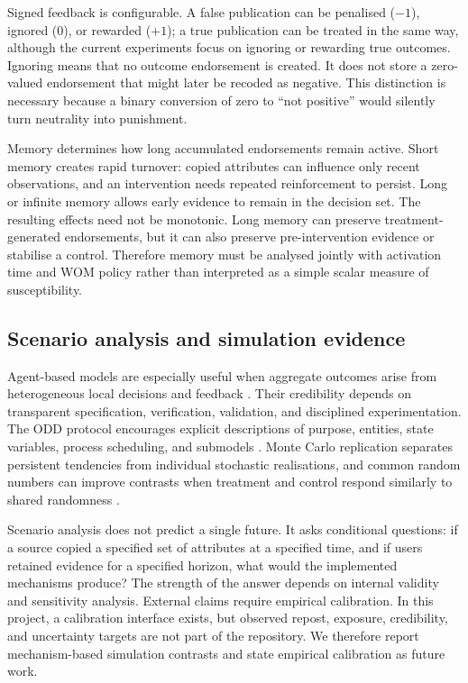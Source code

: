 Signed feedback is configurable. A false publication can be penalised ($-1$), ignored ($0$), or rewarded ($+1$); a true publication can be treated in the same way, although the current experiments focus on ignoring or rewarding true outcomes. Ignoring means that no outcome endorsement is created. It does not store a zero-valued endorsement that might later be recoded as negative. This distinction is necessary because a binary conversion of zero to ``not positive'' would silently turn neutrality into punishment.

Memory determines how long accumulated endorsements remain active. Short memory creates rapid turnover: copied attributes can influence only recent observations, and an intervention needs repeated reinforcement to persist. Long or infinite memory allows early evidence to remain in the decision set. The resulting effects need not be monotonic. Long memory can preserve treatment-generated endorsements, but it can also preserve pre-intervention evidence or stabilise a control. Therefore memory must be analysed jointly with activation time and WOM policy rather than interpreted as a simple scalar measure of susceptibility.

\subsection{Scenario analysis and simulation evidence}

Agent-based models are especially useful when aggregate outcomes arise from heterogeneous local decisions and feedback \citep{macal2010,railsback2019}. Their credibility depends on transparent specification, verification, validation, and disciplined experimentation. The ODD protocol encourages explicit descriptions of purpose, entities, state variables, process scheduling, and submodels \citep{grimm2020}. Monte Carlo replication separates persistent tendencies from individual stochastic realisations, and common random numbers can improve contrasts when treatment and control respond similarly to shared randomness \citep{law2015}.

Scenario analysis does not predict a single future. It asks conditional questions: if a source copied a specified set of attributes at a specified time, and if users retained evidence for a specified horizon, what would the implemented mechanisms produce? The strength of the answer depends on internal validity and sensitivity analysis. External claims require empirical calibration. In this project, a calibration interface exists, but observed repost, exposure, credibility, and uncertainty targets are not part of the repository. We therefore report mechanism-based simulation contrasts and state empirical calibration as future work.
